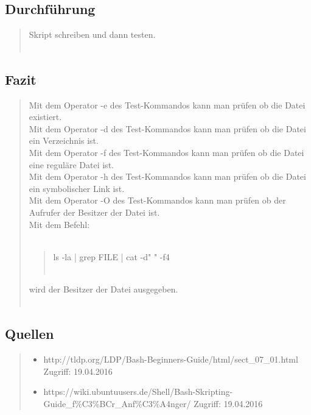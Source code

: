 	\subsection{Durchführung}
		\begin{quote}
			 Skript schreiben und dann testen.\\ \\
		\end{quote}
	\subsection{Fazit}
		\begin{quote}
			Mit dem Operator -e des Test-Kommandos kann man pr\"ufen ob die Datei existiert.\\
			Mit dem Operator -d des Test-Kommandos kann man pr\"ufen ob die Datei ein Verzeichnis ist.\\
			Mit dem Operator -f des Test-Kommandos kann man pr\"ufen ob die Datei eine regul\"are Datei ist.\\
			Mit dem Operator -h des Test-Kommandos kann man pr\"ufen ob die Datei ein symbolischer Link ist.\\
			Mit dem Operator -O des Test-Kommandos kann man pr\"ufen ob der Aufrufer der Besitzer der Datei ist.\\
			Mit dem Befehl: \\ \\
			\begin{quote}
				ls -la | grep FILE | cat -d" " -f4\\ \\
			\end{quote}
			wird der Besitzer der Datei ausgegeben.\\ \\
		\end{quote}
	\subsection{Quellen}
		\begin{quote}
			\begin{itemize}
				\item http://tldp.org/LDP/Bash-Beginners-Guide/html/sect\_07\_01.html Zugriff: 19.04.2016\\
				\item https://wiki.ubuntuusers.de/Shell/Bash-Skripting-Guide\_f\%C3\%BCr\_Anf\%C3\%A4nger/ Zugriff: 19.04.2016\\
			\end{itemize}
		\end{quote}